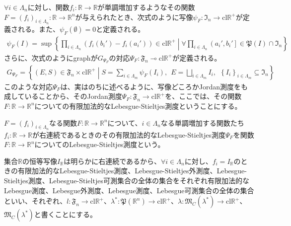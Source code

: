 \documentclass[dvipdfmx]{jsarticle}
\begin{document}
\begin{dfn*}
$\forall i \in \varLambda_{n}$に対し、関数$f_{i}:\mathbb{R} \rightarrow \mathbb{R}$が単調増加するようなその関数$F = \left( f_{i} \right)_{i \in \varLambda_{n}}:\mathbb{R} \rightarrow \mathbb{R}^{n}$が与えられたとき、次式のように写像$\psi_{F}:\mathfrak{I}_{n} \rightarrow \mathrm{cl}\mathbb{R}^{+}$が定義される。また、$\psi_{F}(\emptyset) = 0$と定義される。
\begin{align*}
\psi_{F}(I) = \sup\left\{ \prod_{i \in \varLambda_{n}} \left( f_{i}\left( b_{i}' \right) - f_{i}\left( a_{i}' \right) \right) \in \mathrm{cl}\mathbb{R}^{+} \middle| \forall\prod_{i \in \varLambda_{n}} \left( a_{i}',b_{i}' \right]\in \mathfrak{P}(I) \cap \mathfrak{I}_{n} \right\}
\end{align*}
さらに、次式のようにgraphが$G_{\varPsi_{F}}$の対応$\varPsi_{F}:\mathfrak{F}_{n} \multimap \mathrm{cl}\mathbb{R}^{+}$が定義される。
\begin{align*}
G_{\varPsi_{F}} = \left\{ (E,S) \in \mathfrak{F}_{n} \times \mathrm{cl}\mathbb{R}^{+} \middle| S = \sum_{i \in \varLambda_{m}} {\psi_{F}\left( I_{i} \right)},\ \ E = \bigsqcup_{i \in \varLambda_{m}} I_{i},\ \ \left\{ I_{i} \right\}_{i \in \varLambda_{m}} \subseteq \mathfrak{I}_{n} \right\}
\end{align*}
このような対応$\varPsi_{F}$は、実はのちに述べるように、写像どころかJordan測度をも成していることから、そのJordan測度$\varPsi_{F}:\mathfrak{F}_{n} \rightarrow \mathrm{cl}\mathbb{R}^{+}$を、ここでは、その関数$F:\mathbb{R} \rightarrow \mathbb{R}^{n}$についての有限加法的なLebesgue-Stieltjes測度ということにする。
\end{dfn*}
\begin{dfn*}
$F = \left( f_{i} \right)_{i \in \varLambda_{n}}$なる関数$F:\mathbb{R} \rightarrow \mathbb{R}^{n}$について、$i \in \varLambda_{n}$なる単調増加する関数たち$f_{i}:\mathbb{R} \rightarrow \mathbb{R}$が右連続であるときのその有限加法的なLebesgue-Stieltjes測度$\varPsi_{F}$を関数$F:\mathbb{R} \rightarrow \mathbb{R}^{n}$についてのLebesgue-Stieltjes測度という。
\end{dfn*}
\begin{dfn*}
集合$\mathbb{R}$の恒等写像$I_{\mathbb{R}}$は明らかに右連続であるから、$\forall i \in \varLambda_{n}$に対し、$f_{i} = I_{\mathbb{R}}$のときの有限加法的なLebesgue-Stieltjes測度、Lebesgue-Stieltjes外測度、Lebesgue-Stieltjes測度、Lebesgue-Stieltjes可測集合の全体の集合をそれぞれ有限加法的なLebesgue測度、Lebesgue外測度、Lebesgue測度、Lebesgue可測集合の全体の集合といい、それぞれ、$l:\mathfrak{F}_{n} \rightarrow \mathrm{cl}\mathbb{R}^{+}$、$\lambda^{*}\mathfrak{:P}\left( \mathbb{R}^{n} \right) \rightarrow \mathrm{cl}\mathbb{R}^{+}$、$\lambda:\mathfrak{M}_{C}\left( \lambda^{*} \right) \rightarrow \mathrm{cl}\mathbb{R}^{+}$、$\mathfrak{M}_{C}\left( \lambda^{*} \right)$と書くことにする。
\end{dfn*}\par
\end{document}
